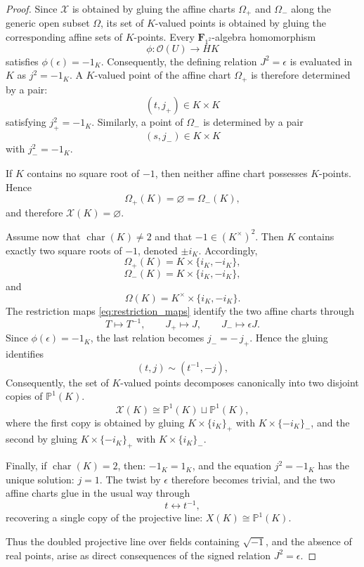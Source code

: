 \documentclass[11pt,a4paper]{article}
\renewcommand{\P}{\mathbb{P}}
\newcommand{\Ftwo}{\mathbf{F}_{1^2}}
\begin{document}
\begin{proof}
Since $\mathcal X$ is obtained by gluing the affine charts $\Omega_+$ and $\Omega_-$
along the generic open subset $\Omega$, its set of $K$-valued points is
obtained by gluing the corresponding affine sets of $K$-points.
Every $\Ftwo$-algebra homomorphism
\[
\phi:\mathcal O(U)\longrightarrow HK
\]
satisfies
$
\phi(\epsilon)=-1_K$. 
Consequently, the defining relation
$
J^2=\epsilon
$
is evaluated in $K$ as
$
j^2=-1_K$.
A $K$-valued point of the affine chart $\Omega_+$ is therefore determined by
a pair:
\[
(t,j_+)\in K\times K
\]
satisfying
$
j_+^2=-1_K$. 
Similarly, a point of $\Omega_-$ is determined by a pair
\[
(s,j_-)\in K\times K
\]
with
$
j_-^2=-1_K$.

If $K$ contains no square root of $-1$, then neither affine chart possesses
$K$-points. Hence
\[
\Omega_+(K)=\varnothing=\Omega_-(K),
\]
and therefore
$
\mathcal X(K)=\varnothing$.

Assume now that $\operatorname{char}(K)\neq2$ and that
$
-1\in (K^\times)^2$. 
Then $K$ contains exactly two square roots of $-1$, denoted
$\pm i_K$. 
Accordingly,
\[
\Omega_+(K)=K\times\{i_K,-i_K\},
\]
\[
\Omega_-(K)=K\times\{i_K,-i_K\},
\]
and
\[
\Omega(K)=K^\times\times\{i_K,-i_K\}.
\]
The restriction maps
\eqref{eq:restriction_maps}
identify the two affine charts through
\begin{equation}\label{eq:restriction_maps1}
T\longmapsto T^{-1},
\qquad
J_+\longmapsto J,
\qquad
J_-\longmapsto\epsilon J.
\end{equation}
Since $\phi(\epsilon)=-1_K$, the last relation becomes
$
j_-= -\,j_+$. 
Hence the gluing identifies
\[
(t,j)\sim(t^{-1},-j),
\]
Consequently,  the set of $K$-valued points decomposes canonically into two disjoint
copies of $\P^1(K)$.
\[
\mathcal X(K)\cong
\P^1(K)\sqcup\P^1(K),
\]
where the first copy is obtained by gluing
$
K\times\{i_K\}_+$
with
$K\times\{-i_K\}_-$, 
and the second by gluing
$
K\times\{-i_K\}_+$ with $K\times\{i_K\}_-$.

Finally, if $\operatorname{char}(K)=2$, then: 
$
-1_K=1_K$, 
and the equation
$
j^2=-1_K
$
has the unique solution: $
j=1$. 
The twist by $\epsilon$ therefore becomes trivial, and the two affine charts
glue in the usual way through
\[
t\longleftrightarrow t^{-1},
\]
recovering a single copy of the projective line:
$
X(K)\cong\P^1(K)$.\vspace{.05in}

Thus the doubled projective line over fields containing $\sqrt{-1}$, and the
absence of real points, arise as direct consequences of the signed relation
$J^2=\epsilon$.
\end{proof}
\end{document}
